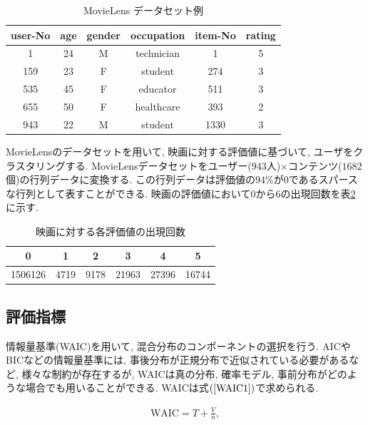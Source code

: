 \documentclass[a4j,12pt]{jarticle}
\begin{document}
\begin{table}[tbp]
\begin{center}
\caption{MovieLens データセット例}   %
\label{MovieLens2}   %
\begin{tabular}{c c c c c c}
\hline
user-No	&	age	&	gender	&	occupation	&	item-No	& rating \\ \hline \hline
1	&	24	&	M	&	technician	&  1  & 5 \\	\hline
159	&    23	&     F	&      student	      &  274 & 3 \\	\hline
535	&	45	&	F	&	educator	&	511	& 3 \\ \hline
655	&	50	&	F	&	healthcare	& 393 & 2 \\	\hline
943	&	22	&	M	&	student	&	1330 & 3 \\  \hline
\end{tabular}
\end{center}
\end{table}

MovieLensのデータセットを用いて, 映画に対する評価値に基づいて, ユーザをクラスタリングする. MovieLensデータセットをユーザー($943$人)$\times$コンテンツ($1682$個)の行列データに変換する. この行列データは評価値の$94\%$が$0$であるスパースな行列として表すことができる. 映画の評価値において$0$から$6$の出現回数を表\ref{MovieLens3}に示す.

\begin{table}[tbp]
\begin{center}
\caption{映画に対する各評価値の出現回数}   %
\label{MovieLens3}   %
\begin{tabular}{c c c c c c}
\hline
0 & 1 & 2 & 3 & 4 & 5 \\ \hline 
1506126 & 4719 & 9178 & 21963 & 27396 & 16744 \\ \hline
\end{tabular}
\end{center}
\end{table}

\subsection{評価指標}

情報量基準(WAIC)を用いて, 混合分布のコンポーネントの選択を行う. AICやBICなどの情報量基準には, 事後分布が正規分布で近似されている必要があるなど, 様々な制約が存在するが, WAICは真の分布, 確率モデル, 事前分布がどのような場合でも用いることができる. WAICは式$(\ref{WAIC1})$で求められる.

\begin{eqnarray}
\label{WAIC1}
\mbox{WAIC} = T + \frac{V}{n}, 
\end{eqnarray}
\end{document}
